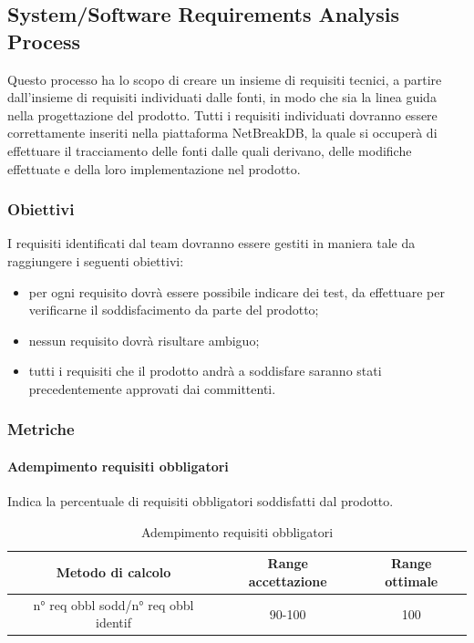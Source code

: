 	\subsection{System/Software Requirements Analysis Process}
	Questo processo ha lo scopo di creare un insieme di requisiti tecnici, a partire dall'insieme di requisiti individuati dalle fonti, in modo che sia la linea guida nella progettazione del prodotto.
	Tutti i requisiti individuati dovranno essere correttamente inseriti nella piattaforma NetBreakDB,
	la quale si occuperà di effettuare il tracciamento delle fonti dalle quali derivano, delle modifiche
	effettuate e della loro implementazione nel prodotto.
		
		\subsubsection{Obiettivi}
		I requisiti identificati dal team dovranno essere gestiti in maniera tale da raggiungere i seguenti
		obiettivi:
		\begin{itemize}
			\item per ogni requisito dovrà essere possibile indicare dei test, da effettuare per verificarne il soddisfacimento da parte del prodotto;
			\item nessun requisito dovrà risultare ambiguo;
			\item tutti i requisiti che il prodotto andrà a soddisfare saranno stati precedentemente approvati
			dai committenti.
		\end{itemize}
		\subsubsection{Metriche}
			\paragraph{Adempimento requisiti obbligatori}
			Indica la percentuale di requisiti obbligatori soddisfatti dal prodotto.
			\begin{table}[H]
				\begin{center}
					\begin{tabular}{|c|c|c|}
						\hline
						\textbf{Metodo di calcolo} & \textbf{Range accettazione} & \textbf{Range ottimale} \\
						\hline
						n° req obbl sodd/n° req obbl identif & 90-100  & 100 \\
						\hline
					\end{tabular}
				\end{center}
				\caption{Adempimento requisiti obbligatori}
			\end{table}
	
